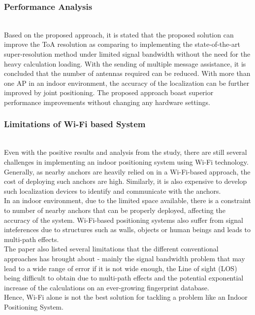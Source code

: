 \documentclass{l4proj}
\begin{document}
\subsubsection{Performance Analysis}~\\
Based on the proposed approach, it is stated that the proposed solution can improve the ToA resolution as comparing to implementing the state-of-the-art super-resolution method under limited signal bandwidth without the need for the heavy calculation loading. With the sending of multiple message assistance, it is concluded that the number of antennas required can be reduced. With more than one AP in an indoor environment, the accuracy of the localization can be further improved by joint positioning. The proposed approach boast superior performance improvements without changing any hardware settings.\cite{conclusion}\\
\subsubsection{Limitations of Wi-Fi based System}~\\
Even with the positive results and analysis from the study, there are still several challenges in implementing an indoor positioning system using Wi-Fi technology. Generally, as nearby anchors are heavily relied on in a Wi-Fi-based approach, the cost of deploying such anchors are high. Similarly, it is also expensive to develop such localization devices to identify and communicate with the anchors.\\
In an indoor environment, due to the limited space available, there is a constraint to number of nearby anchors that can be properly deployed, affecting the accuracy of the system. Wi-Fi-based positioning systems also suffer from signal inteferences due to structures such as walls, objects or human beings and leads to multi-path effects.\\
The paper also listed several limitations that the different conventional approaches has brought about - mainly the signal bandwidth problem that may lead to a wide range of error if it is not wide enough, the Line of sight (LOS) being difficult to obtain due to multi-path effects and the potential exponential increase of the calculations on an ever-growing fingerprint database.\\
Hence, Wi-Fi alone is not the best solution for tackling a problem like an Indoor Positioning System.\\
\end{document}
